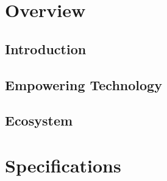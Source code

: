 \documentclass[12pt,fleqn]{book} %
\begin{document}

\pagestyle{empty} %

\tableofcontents %

\cleardoublepage %

\pagestyle{fancy} %

\part{Overview}



\chapter{Introduction}



\chapter{Empowering Technology}



\chapter{Ecosystem}



\part{Specifications}\label{part:specifications}

\end{document}
